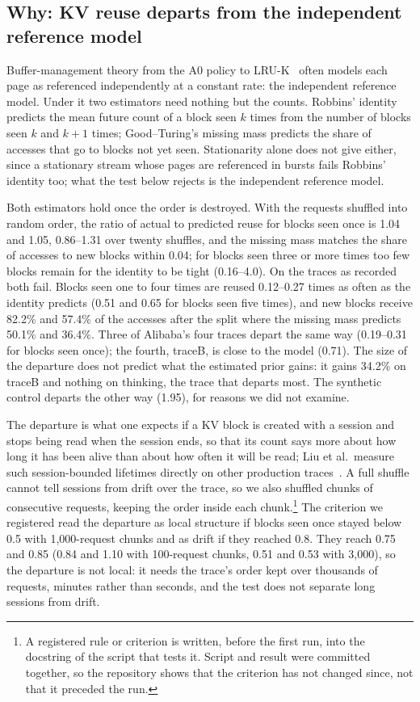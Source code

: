 \subsection{Why: KV reuse departs from the independent reference model}
\label{sec:why}
Buffer-management theory from the A0 policy to LRU-K~\cite{oneil1993lruk} often models each page as
referenced independently at a constant rate: the independent reference model. Under it two estimators need
nothing but the counts. Robbins' identity predicts the mean future count of a block seen $k$ times from the
number of blocks seen $k$ and $k{+}1$ times; Good--Turing's missing mass predicts the share of accesses that
go to blocks not yet seen. Stationarity alone does not give either, since a stationary stream whose pages are
referenced in bursts fails Robbins' identity too; what the test below rejects is the independent reference
model.

Both estimators hold once the order is destroyed. With the requests shuffled into random order, the ratio of actual to predicted reuse for
blocks seen once is 1.04 and 1.05, 0.86--1.31 over twenty shuffles, and the missing mass matches the share
of accesses to new blocks within 0.04; for blocks seen three or more times too few blocks remain for the
identity to be tight (0.16--4.0). On the traces as recorded both fail. Blocks seen one to four times are
reused 0.12--0.27 times as often as the identity predicts (0.51 and 0.65 for blocks seen five times), and
new blocks receive 82.2\% and 57.4\% of the accesses after the split where the missing mass predicts 50.1\%
and 36.4\%. Three of Alibaba's four traces depart the same way (0.19--0.31 for blocks seen once); the fourth,
traceB, is close to the model (0.71). The size of the departure does not predict what the estimated prior
gains: it gains 34.2\% on traceB and nothing on thinking, the trace that departs most. The synthetic
control departs the other way (1.95), for reasons we did not examine.

The departure is what one expects if a KV block is created with a session and stops being read when the
session ends, so that its count says more about how long it has been alive than about how often it will be
read; Liu et al.\ measure such session-bounded lifetimes directly on other production
traces~\cite{liu2026fancyeviction}. A full shuffle cannot tell sessions from drift over the trace, so we
also shuffled chunks of consecutive requests, keeping the order inside each chunk.\footnote{A registered
rule or criterion is written, before the first run, into the docstring of the script that tests it.
Script and result were committed together, so the repository shows that the criterion has not changed
since, not that it preceded the run.} The criterion we registered read the departure as local structure
if blocks seen once stayed below 0.5 with 1,000-request chunks and as drift if they reached 0.8. They
reach 0.75 and 0.85 (0.84 and 1.10 with 100-request chunks, 0.51 and 0.53 with 3,000), so the departure
is not local: it needs the trace's order kept over thousands of requests, minutes rather than seconds, and
the test does not separate long sessions from drift.

